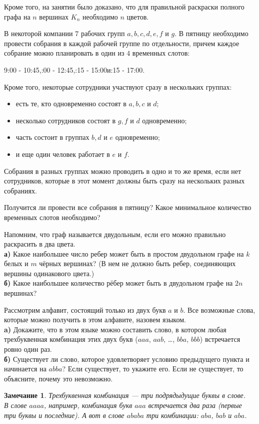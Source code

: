 \documentclass[a4paper,12pt]{article}
\newtheorem*{rem}{Замечание}
\newcounter{z}
\newcommand{\z}{\refstepcounter{z}\vskip 20pt\noindent
\fbox{\textbf{\arabic{z}}} }
\begin{document}
Кроме того, на занятии было доказано, что для правильной раскраски полного графа на $n$ вершинах $K_n$ необходимо $n$ цветов.

\z В некоторой компании $7$ рабочих групп $a,b,c,d,e,f$ и $g$. В пятницу необходимо провести собрания в каждой рабочей группе по отдельности, причем каждое собрание можно планировать в один из $4$ временных слотов: \\
\centerline{9:00 - 10:45,:00 - 12:45,:15 - 15:00\quad и:15 - 17:00.}

\noindent Кроме того, некоторые сотрудники участвуют сразу в нескольких группах:
\begin{itemize}
\item есть те, кто одновременно состоят в $a,b,c$ и $d$;

\item несколько сотрудников состоят в $g,f$ и $d$ одновременно;

\item часть состоит в группах $b,d$ и $e$ одновременно;

\item и еще один человек работает в $e$ и $f$.
\end{itemize}

Собрания в разных группах можно проводить в одно и то же время, если нет сотрудников, которые в этот момент должны быть сразу на нескольких разных собраниях.

Получится ли провести все собрания в пятницу? Какое минимальное количество временных слотов необходимо?


\z Напомним, что граф называется двудольным, если его можно правильно раскрасить в два цвета.\\
{\bf а)}  Какое наибольшее число ребер может быть в простом двудольном графе на $k$ белых и $m$ чёрных вершинах? (В нем не должно быть ребер, соединяющих вершины одинакового цвета.)\\
{\bf б)} Какое наибольшее количество рёбер может быть в двудольном графе на $2n$ вершинах?

\z Рассмотрим алфавит, состоящий только из двух букв $a$ и $b$. Все возможные слова, которые можно получить в этом алфавите, назовем языком.\\
{\bf a)} Докажите, что в этом языке можно составить слово, в котором любая трехбуквенная комбинация этих двух букв ($aaa$, $aab$, \ldots, $bba$, $bbb$) встречается ровно один раз.\\
{\bf б)} Существует ли слово, которое удовлетворяет условию предыдущего пункта и начинается на $abba$? Если существует, то укажите его. Если не существует, то объясните, почему это невозможно.

\begin{rem}
Трехбуквенная комбинация --- три подрядыдущие буквы в слове. 
\\В слове $aaaa$, например, комбинация букв $aaa$ встречается два раза (первые три буквы и последние).
А вот в слове $ababa$ три комбинации: $aba$, $bab$ и $aba$.
\end{rem}
\end{document}
